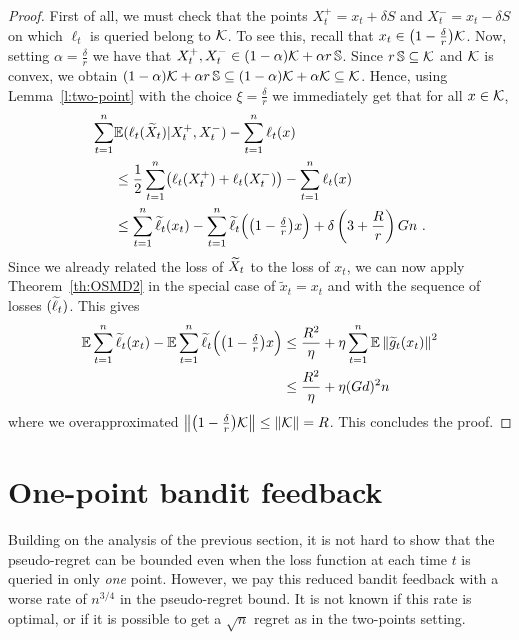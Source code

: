 \begin{proof}
First of all, we must check that the points $X_t^+ = x_t + \delta S$ and $X_t^- = x_t - \delta S$ on which $\ell_t$ is queried belong to $\mathcal{K}$. To see this, recall that $x_t\in \bigl(1-\tfrac{\delta}{r}\bigr)\mathcal{K}$. Now, setting $\alpha = \tfrac{\delta}{r}$ we have that $X_t^+,X_t^- \in (1-\alpha)\mathcal{K} + \alpha r\,\mathbb{S}$. Since $r\,\mathbb{S} \subseteq \mathcal{K}$ and $\mathcal{K}$ is convex, we obtain $(1-\alpha)\mathcal{K} + \alpha r\,\mathbb{S} \subseteq (1-\alpha)\mathcal{K} + \alpha\mathcal{K} \subseteq \mathcal{K}$. Hence, using Lemma~\ref{l:two-point} with the choice $\xi = \tfrac{\delta}{r}$ we immediately get that for all $x\in\mathcal{K}$,
\begin{align*}
    \sum_{t=1}^n & \mathbb{E}( \ell_t(\widetilde{X}_t) | X_t^+, X_t^-) - \sum_{t=1}^n \ell_t(x)
\\& \le
    \frac{1}{2}\sum_{t=1}^n \bigl(\ell_t(X_t^+) + \ell_t(X_t^-)\bigr) - \sum_{t=1}^n \ell_t(x)
\\& \le
    \sum_{t=1}^n \widetilde{\ell}_t(x_t) - \sum_{t=1}^n \widetilde{\ell}_t\Bigl(\bigl(1-\tfrac{\delta}{r}\bigr)x\Bigr) + \delta\left(3 + \frac{R}{r} \right) G n~.
\end{align*}
Since we already related the loss of $\widetilde{X}_t$ to the loss of $x_t$, we can now apply Theorem~\ref{th:OSMD2} in the special case of $\tilde{x}_t = x_t$ and with the sequence of losses $(\widetilde{\ell}_t)$. This gives
\begin{align*}
    \mathbb{E} \sum_{t=1}^n \widetilde{\ell}_t(x_t) - \mathbb{E} \sum_{t=1}^n \widetilde{\ell}_t\Bigl(\bigl(1-\tfrac{\delta}{r}\bigr)x\Bigr)
& \le
    \frac{R^2}{\eta} + \eta\sum_{t=1}^n \mathbb{E} \left\|{\widetilde{g}_t(x_t)}\right\|^2
\\& \le
    \frac{R^2}{\eta} + \eta (Gd)^2 n
\end{align*}
where we overapproximated $\left\|{\bigl(1-\tfrac{\delta}{r}\bigr)\mathcal{K}}\right\| \le \left\|{\mathcal{K}}\right\| = R$. This concludes the proof.
\end{proof}


\section{One-point bandit feedback}
%
Building on the analysis of the previous section, it is not hard to show that the pseudo-regret can be bounded even when the loss function at each time $t$ is queried in only \textsl{one} point. However, we pay this reduced bandit feedback with a worse rate of $n^{3/4}$ in the pseudo-regret bound. It is not known if this rate is optimal, or if it is possible to get a $\sqrt{n}$ regret as in the two-points setting.

